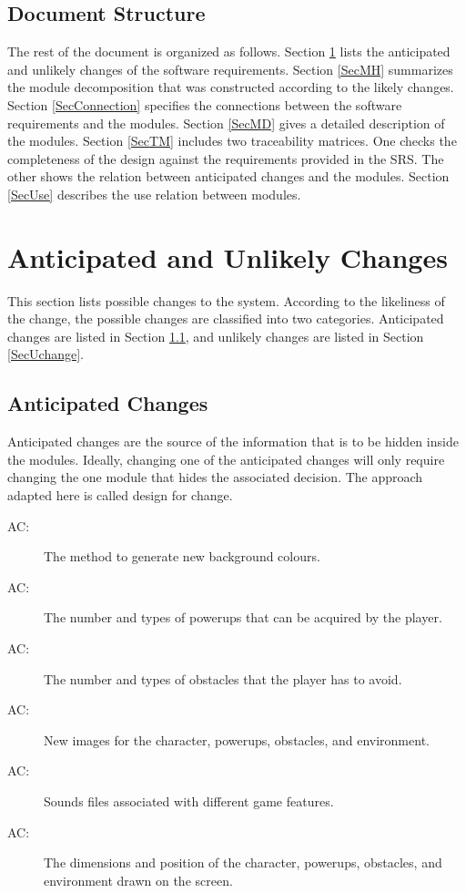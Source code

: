 \documentclass[12pt, titlepage]{article}
\newcounter{acnum}
\newcommand{\actheacnum}{AC\theacnum}
\begin{document}
\subsection*{Document Structure}
The rest of the document is organized as follows. Section
\ref{SecChange} lists the anticipated and unlikely changes of the software
requirements. Section \ref{SecMH} summarizes the module decomposition that
was constructed according to the likely changes. Section \ref{SecConnection}
specifies the connections between the software requirements and the
modules. Section \ref{SecMD} gives a detailed description of the
modules. Section \ref{SecTM} includes two traceability matrices. One checks
the completeness of the design against the requirements provided in the SRS. The
other shows the relation between anticipated changes and the modules. Section
\ref{SecUse} describes the use relation between modules.
\section{Anticipated and Unlikely Changes}
\label{SecChange}

This section lists possible changes to the system. According to the likeliness
of the change, the possible changes are classified into two
categories. Anticipated changes are listed in Section \ref{SecAchange}, and
unlikely changes are listed in Section \ref{SecUchange}.

\subsection{Anticipated Changes} \label{SecAchange}

Anticipated changes are the source of the information that is to be hidden
inside the modules. Ideally, changing one of the anticipated changes will only
require changing the one module that hides the associated decision. The approach
adapted here is called design for
change.

\begin{description}
\item[ \actheacnum \label{ac1}:] The method to generate new background colours.
\item[ \actheacnum \label{ac2}:] The number and types of powerups that can be acquired by the player.
\item [ \actheacnum \label{ac3}:] The number and types of obstacles that the player has to avoid.
\item [ \actheacnum \label{ac4}:] New images for the character, powerups, obstacles, and environment.
\item [ \actheacnum \label{ac5}:] Sounds files associated with different game features.
\item [ \actheacnum \label{ac6}:] The dimensions and position of the character, powerups, obstacles, and environment drawn on the screen.
\end{description}
\end{document}

